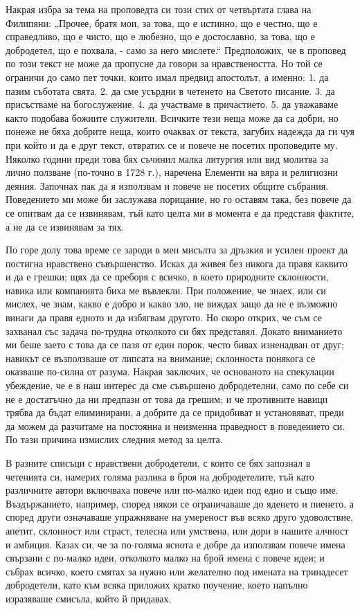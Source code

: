 \documentclass[12pt]{book}
\begin{document}
Накрая избра за тема на проповедта си този стих от четвъртата глава на Филипяни: „Прочее, братя мои, за това, що е истинно, що е честно, що е справедливо, що е чисто, що е любезно, що е достославно, за това, що е добродетел, що е похвала, - само за него мислете.“ Предположих, че в проповед по този текст не може да пропусне да говори за нравствеността. Но той се ограничи до само пет точки, които имал предвид апостолът, а именно: 1. да пазим съботата свята. 2. да сме усърдни в четенето на Светото писание. 3. да присъстваме на богослужение. 4. да участваме в причастието. 5. да уважаваме както подобава божиите служители. Всичките тези неща може да са добри, но понеже не бяха добрите неща, които очаквах от текста, загубих надежда да ги чуя при който и да е друг текст, отвратих се и повече не посетих проповедите му. Няколко години преди това бях съчинил малка литургия или вид молитва за лично ползване (по-точно в 1728 г.), наречена Елементи на вяра и религиозни деяния. Започнах пак да я използвам и повече не посетих общите събрания. Поведението ми може би заслужава порицание, но го оставям така, без повече да се опитвам да се извинявам, тъй като целта ми в момента е да представя фактите, а не да се извинявам за тях.

По горе долу това време се зароди в мен мисълта за дръзкия и усилен проект да постигна нравствено съвършенство. Исках да живея без никога да правя каквито и да е грешки; щях да се преборя с всичко, в което природните склонности, навика или компанията биха ме въвлекли. При положение, че знаех, или си мислех, че знам, какво е добро и какво зло, не виждах защо да не е възможно винаги да правя едното и да избягвам другото. Но скоро открих, че съм се захванал със задача по-трудна отколкото си бях представял. Докато вниманието ми беше заето с това да се пазя от един порок, често бивах изненадван от друг; навикът се възползваше от липсата на внимание; склонноста понякога се оказваше по-силна от разума. Накрая заключих, че основаното на спекулации убеждение, че е в наш интерес да сме съвършено добродетелни, само по себе си не е достатъчно да ни предпази от това да грешим; и че противните навици трябва да бъдат елиминирани, а добрите да се придобиват и установяват, преди да можем да разчитаме на постоянна и неизменна праведност в поведението си. По тази причина измислих следния метод за целта. 

В разните списъци с нравствени добродетели, с които се бях запознал в четенията си, намерих голяма разлика в броя на добродетелите, тъй като различните автори включваха повече или по-малко идеи под едно и също име. Въздържанието, например, според някои се ограничаваше до яденето и пиенето, а според други означаваше упражняване на умереност във всяко друго удоволствие, апетит, склонност или страст, телесна или умствена, или дори в нашите алчност и амбиция. Казах си, че за по-голяма яснота е добре да използвам повече имена свързани с по-малко идеи, отколкото малко на брой имена с повече идеи; и събрах всичко, което смятах за нужно или желателно под имената на тринадесет добродетели, като към всяка приложих кратко поучение, което напълно изразяваше смисъла, който й придавах. 
\end{document}
